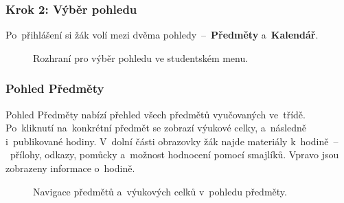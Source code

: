 \documentclass[male,czech,api_bc]{kitheses}
\begin{document}
\newpage

\subsubsection{Krok 2: Výběr pohledu}
Po~přihlášení si žák volí mezi dvěma pohledy~--~\textbf{Předměty} a~\textbf{Kalendář}.

\begin{figure}[H]
	\centering
	\caption{Rozhraní pro výběr pohledu ve studentském menu.}
	\label{fig:manual-6}
\end{figure}

\subsubsection{Pohled Předměty}
Pohled Předměty nabízí přehled všech předmětů vyučovaných ve~třídě. Po~kliknutí na~konkrétní předmět se zobrazí výukové celky, a~následně i~publikované hodiny. V~dolní části obrazovky žák najde materiály k~hodině~--~přílohy, odkazy, pomůcky a~možnost hodnocení pomocí smajlíků. Vpravo jsou zobrazeny informace o~hodině.

\begin{figure}[H]
	\centering
	\caption{Navigace předmětů a~výukových celků v~pohledu předměty.}
	\label{fig:manual-7}
\end{figure}
\end{document}
